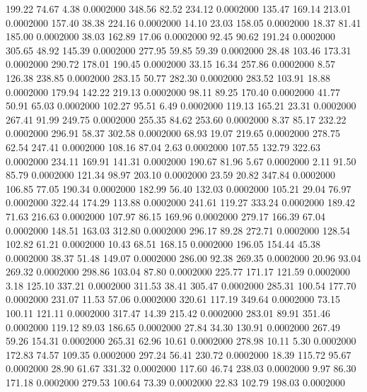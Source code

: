  199.22   74.67    4.38   0.0002000
 348.56   82.52  234.12   0.0002000
 135.47  169.14  213.01   0.0002000
 157.40   38.38  224.16   0.0002000
  14.10   23.03  158.05   0.0002000
  18.37   81.41  185.00   0.0002000
  38.03  162.89   17.06   0.0002000
  92.45   90.62  191.24   0.0002000
 305.65   48.92  145.39   0.0002000
 277.95   59.85   59.39   0.0002000
  28.48  103.46  173.31   0.0002000
 290.72  178.01  190.45   0.0002000
  33.15   16.34  257.86   0.0002000
   8.57  126.38  238.85   0.0002000
 283.15   50.77  282.30   0.0002000
 283.52  103.91   18.88   0.0002000
 179.94  142.22  219.13   0.0002000
  98.11   89.25  170.40   0.0002000
  41.77   50.91   65.03   0.0002000
 102.27   95.51    6.49   0.0002000
 119.13  165.21   23.31   0.0002000
 267.41   91.99  249.75   0.0002000
 255.35   84.62  253.60   0.0002000
   8.37   85.17  232.22   0.0002000
 296.91   58.37  302.58   0.0002000
  68.93   19.07  219.65   0.0002000
 278.75   62.54  247.41   0.0002000
 108.16   87.04    2.63   0.0002000
 107.55  132.79  322.63   0.0002000
 234.11  169.91  141.31   0.0002000
 190.67   81.96    5.67   0.0002000
   2.11   91.50   85.79   0.0002000
 121.34   98.97  203.10   0.0002000
  23.59   20.82  347.84   0.0002000
 106.85   77.05  190.34   0.0002000
 182.99   56.40  132.03   0.0002000
 105.21   29.04   76.97   0.0002000
 322.44  174.29  113.88   0.0002000
 241.61  119.27  333.24   0.0002000
 189.42   71.63  216.63   0.0002000
 107.97   86.15  169.96   0.0002000
 279.17  166.39   67.04   0.0002000
 148.51  163.03  312.80   0.0002000
 296.17   89.28  272.71   0.0002000
 128.54  102.82   61.21   0.0002000
  10.43   68.51  168.15   0.0002000
 196.05  154.44   45.38   0.0002000
  38.37   51.48  149.07   0.0002000
 286.00   92.38  269.35   0.0002000
  20.96   93.04  269.32   0.0002000
 298.86  103.04   87.80   0.0002000
 225.77  171.17  121.59   0.0002000
   3.18  125.10  337.21   0.0002000
 311.53   38.41  305.47   0.0002000
 285.31  100.54  177.70   0.0002000
 231.07   11.53   57.06   0.0002000
 320.61  117.19  349.64   0.0002000
  73.15  100.11  121.11   0.0002000
 317.47   14.39  215.42   0.0002000
 283.01   89.91  351.46   0.0002000
 119.12   89.03  186.65   0.0002000
  27.84   34.30  130.91   0.0002000
 267.49   59.26  154.31   0.0002000
 265.31   62.96   10.61   0.0002000
 278.98   10.11    5.30   0.0002000
 172.83   74.57  109.35   0.0002000
 297.24   56.41  230.72   0.0002000
  18.39  115.72   95.67   0.0002000
  28.90   61.67  331.32   0.0002000
 117.60   46.74  238.03   0.0002000
   9.97   86.30  171.18   0.0002000
 279.53  100.64   73.39   0.0002000
  22.83  102.79  198.03   0.0002000
